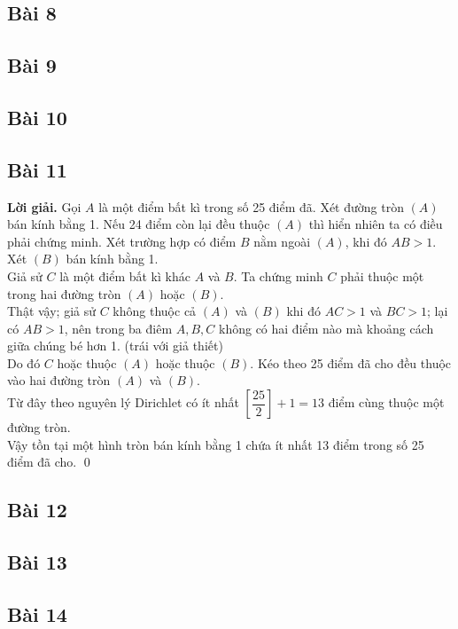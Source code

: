 \documentclass[a4paper,14pt]{article}
\begin{document}
    \subsection{Bài 8}

    \subsection{Bài 9}

    \subsection{Bài 10}

    \subsection{Bài 11}
        \textbf{Lời giải.}
            Gọi $A$ là một điểm bất kì trong số 25 điểm đã. Xét đường tròn $(A)$ bán kính bằng 1. Nếu 24 điểm còn lại đều thuộc $(A)$ thì hiển nhiên ta có điều phải chứng minh. Xét trường hợp có điểm $B$ nằm ngoài $(A)$, khi đó $AB>1$. Xét $(B)$ bán kính bằng 1. \\
            Giả sử $C$ là một điểm bất kì khác $A$ và $B$. Ta chứng minh $C$ phải thuộc một trong hai đường tròn $(A)$ hoặc $(B)$. \\
            Thật vậy; giả sử $C$ không thuộc cả $(A)$ và $(B)$ khi đó $AC>1$ và $BC>1$; lại có $AB>1$, nên trong ba điêm $A,B,C$ không có hai điểm nào mà khoảng cách giữa chúng bé hơn 1. (trái với giả thiết) \\
            Do đó $C$ hoặc thuộc $(A)$ hoặc thuộc $(B)$. Kéo theo 25 điểm đã cho đều thuộc vào hai đường tròn $(A)$ và $(B)$. \\
            Từ đây theo nguyên lý Dirichlet có ít nhất $\left[\dfrac{25}{2}\right]+1=13$ điểm cùng thuộc một đường tròn. \\
            Vậy tồn tại một hình tròn bán kính bằng 1 chứa ít nhất 13 điểm trong số 25 điểm đã cho.         
        \qed
    \subsection{Bài 12}

    \subsection{Bài 13}

    \subsection{Bài 14}
\end{document}
